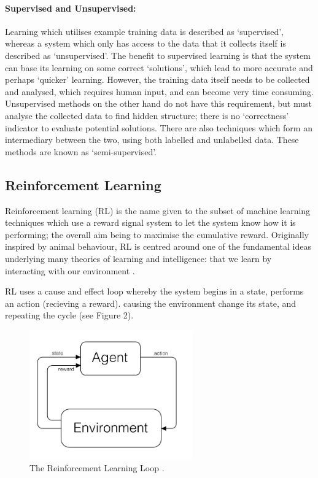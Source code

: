 \documentclass[a4paper,oneside]{report}
\begin{document}
\paragraph{Supervised and Unsupervised:} Learning which utilises example training data is described as `supervised', whereas a system which only has access to the data that it collects itself is described as `unsupervised'. The benefit to supervised learning is that the system can base its learning on some correct `solutions', which lead to more accurate and perhaps `quicker' learning. However, the training data itself needs to be collected and analysed, which requires human input, and can become very time consuming. Unsupervised methods on the other hand do not have this requirement, but must analyse the collected data to find hidden structure; there is no `correctness' indicator to evaluate potential solutions. There are also techniques which form an intermediary between the two, using both labelled and unlabelled data. These methods are known as `semi-supervised'.

\subsection{Reinforcement Learning}

Reinforcement learning (RL) is the name given to the subset of machine learning techniques which use a reward signal system to let the system know how it is performing; the overall aim being to maximise the cumulative reward. Originally inspired by animal behaviour, RL is centred around one of the fundamental ideas underlying many theories of learning and intelligence: that we learn by interacting with our environment \cite{Sutton:2005kl}. 

RL uses a cause and effect loop whereby the system begins in a state, performs an action (recieving a reward). causing the environment change its state, and repeating the cycle (see Figure 2).

\begin{figure}[h!]
  \centering
    \includegraphics[width=70mm]{sources/images/RLDiagram}
    \caption{The Reinforcement Learning Loop \cite{Nilsson:2010qa}.\label{screen}}
\end{figure}
\end{document}
